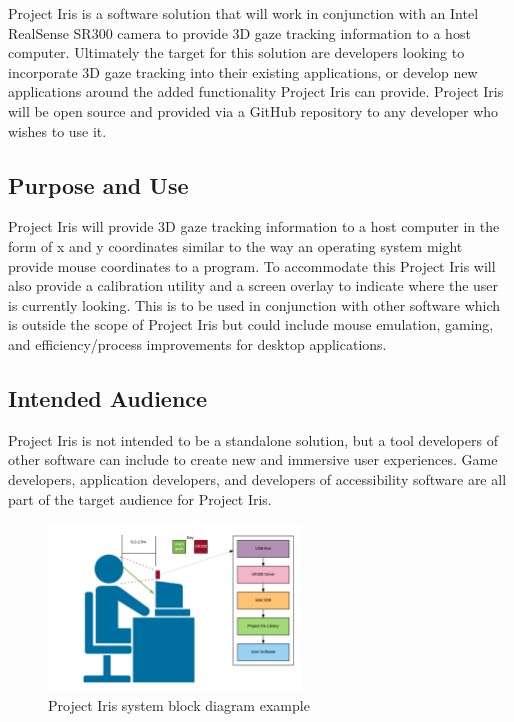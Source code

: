 Project Iris is a software solution that will work in conjunction with an Intel RealSense SR300 camera to provide 3D gaze tracking information to a host computer. Ultimately the target for this solution are developers looking to incorporate 3D gaze tracking into their existing applications, or develop new applications around the added functionality Project Iris can provide. Project Iris will be open source and provided via a GitHub repository to any developer who wishes to use it.

\subsection{Purpose and Use}
Project Iris will provide 3D gaze tracking information to a host computer in the form of x and y coordinates similar to the way an operating system might provide mouse coordinates to a program. To accommodate this Project Iris will also provide a calibration utility and a screen overlay to indicate where the user is currently looking. This is to be used in conjunction with other software which is outside the scope of Project Iris but could include mouse emulation, gaming, and efficiency/process improvements for desktop applications.

\subsection{Intended Audience}
Project Iris is not intended to be a standalone solution, but a tool developers of other software can include to create new and immersive user experiences. Game developers, application developers, and developers of accessibility software are all part of the target audience for Project Iris.

\begin{figure}[h!]
	\centering
   	\includegraphics[width=0.60\textwidth]{images/project-iris-system-block}
    \caption{Project Iris system block diagram example}
\end{figure}
